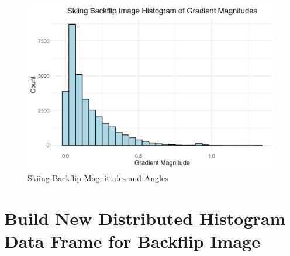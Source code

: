 \documentclass[
  letterpaper,
  DIV=11,
  numbers=noendperiod]{scrreprt}
\begin{document}
\begin{figure}

\begin{minipage}{0.50\linewidth}

\includegraphics{images/plots/backflip/backflip_histogram_mag_plot.jpg}

\end{minipage}%

\caption{\label{fig-flip-histograms}Skiing Backflip Magnitudes and
Angles}

\end{figure}%

\section{Build New Distributed Histogram Data Frame for Backflip
Image}\label{build-new-distributed-histogram-data-frame-for-backflip-image}
\end{document}
